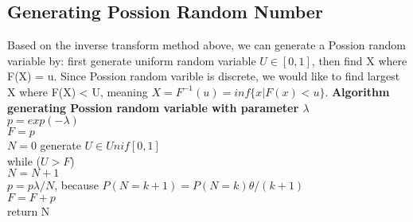 \documentclass[a4paper]{article}
\begin{document}
\subsection{Generating Possion Random Number}
Based on the inverse transform method above, we can generate a Possion random variable by: first generate uniform random variable $U \in [0, 1]$, then find X where F(X) = u. Since Possion random varible is discrete, we would like to find largest X where F(X) < U, meaning $X = F^{-1}(u) = inf\{x | F(x) < u\}$.
{\bf Algorithm generating Possion random variable with parameter $\lambda$}\\
$p = exp(-\lambda)$ \\
$F = p$ \\
$N = 0$
generate $U \in Unif[0, 1]$\\
while ($U > F$)\\
\indent $N = N + 1$\\
\indent $p = p\lambda/N$, because $P(N = k + 1) = P(N = k)\theta/(k + 1)$ \\
\indent $F = F + p$ \\
return N\\
        
\end{document}
